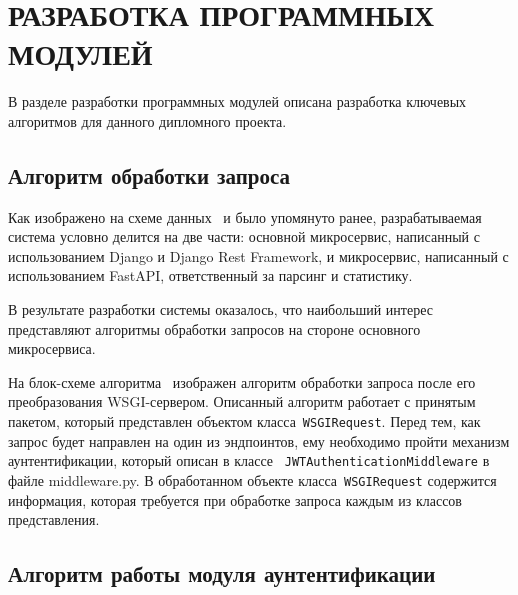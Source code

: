 \section{РАЗРАБОТКА ПРОГРАММНЫХ МОДУЛЕЙ}
\label{sec:dev}

В разделе разработки программных модулей описана разработка ключевых алгоритмов для данного дипломного проекта.



\subsection{Алгоритм обработки запроса}
Как изображено на схеме данных \dataScheme\ и было упомянуто ранее, разрабатываемая система условно делится на две части:
основной микросервис, написанный с использованием Django и Django Rest Framework,
и микросервис, написанный с использованием FastAPI, ответственный за парсинг и статистику.

В результате разработки системы оказалось, что наибольший интерес представляют алгоритмы обработки запросов на стороне основного микросервиса.

На блок-схеме алгоритма \blockScheme\ изображен алгоритм обработки запроса после его преобразования WSGI-сервером.
Описанный алгоритм работает с принятым пакетом, который представлен объектом класса~\lstinline{WSGIRequest}.
Перед тем, как запрос будет направлен на один из эндпоинтов, ему необходимо пройти механизм аунтентификации, который описан в классе
~\lstinline{JWTAuthenticationMiddleware} в файле middleware.py.
В обработанном объекте класса~\lstinline{WSGIRequest} содержится информация,
которая требуется при обработке запроса каждым из классов представления.

\subsection{Алгоритм работы модуля аунтентификации}

